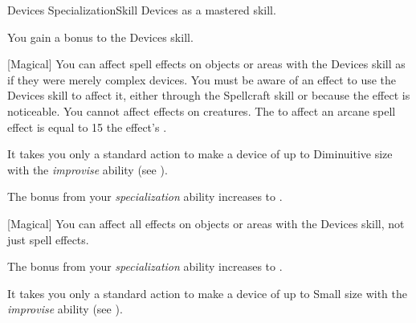     \begin{feat}{Devices Specialization}{Skill}
        \featpre Devices as a mastered skill.

         You gain a  bonus to the Devices skill.

        [Magical] You can affect spell effects on objects or areas with the Devices skill as if they were merely complex devices.
        You must be aware of an effect to use the Devices skill to affect it, either through the Spellcraft skill or because the effect is noticeable.
        You cannot affect effects on creatures.
        The  to affect an arcane spell effect is equal to 15 \add the effect's .

         It takes you only a standard action to make a device of up to Diminuitive size with the \textit{improvise} ability (see ).

         The bonus from your \textit{specialization} ability increases to .
        
        [Magical] You can affect all  effects on objects or areas with the Devices skill, not just spell effects.

         The bonus from your \textit{specialization} ability increases to .

         It takes you only a standard action to make a device of up to Small size with the \textit{improvise} ability (see ).
    \end{feat}

